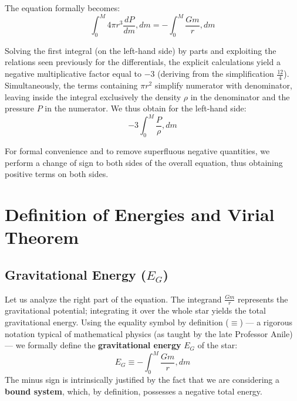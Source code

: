 The equation formally becomes:
\begin{equation}
\int_{0}^{M} 4\pi r^3 \frac{dP}{dm} , dm = - \int_{0}^{M} \frac{Gm}{r} , dm
\end{equation}

Solving the first integral (on the left-hand side) by parts and exploiting the relations seen previously for the differentials, the explicit calculations yield a negative multiplicative factor equal to $-3$ (deriving from the simplification $\frac{12}{4}$). Simultaneously, the terms containing $\pi r^2$ simplify numerator with denominator, leaving inside the integral exclusively the density $\rho$ in the denominator and the pressure $P$ in the numerator.
We thus obtain for the left-hand side:
\begin{equation}
-3 \int_{0}^{M} \frac{P}{\rho} , dm
\end{equation}

For formal convenience and to remove superfluous negative quantities, we perform a change of sign to both sides of the overall equation, thus obtaining positive terms on both sides.

\section{Definition of Energies and Virial Theorem}

\subsection{Gravitational Energy ($E_G$)}
Let us analyze the right part of the equation. The integrand $\frac{Gm}{r}$ represents the gravitational potential; integrating it over the whole star yields the total gravitational energy. Using the equality symbol by definition ($\equiv$) --- a rigorous notation typical of mathematical physics (as taught by the late Professor Anile) --- we formally define the \textbf{gravitational energy} $E_G$ of the star:
\begin{equation}
E_G \equiv - \int_{0}^{M} \frac{Gm}{r} , dm
\end{equation}
The minus sign is intrinsically justified by the fact that we are considering a \textbf{bound system}, which, by definition, possesses a negative total energy.

